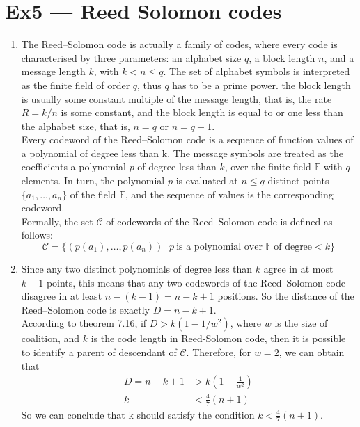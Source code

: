 \documentclass[12pt, a4paper]{article}
\begin{document}
\section*{Ex5 --- Reed Solomon codes}
\begin{enumerate}
    \item The Reed–Solomon code is actually a family of codes, where every code is characterised by three parameters: 
          an alphabet size $q$, a block length $n$, and a message length $k$, with $k < n \leq q$. 
          The set of alphabet symbols is interpreted as the finite field of order $q$, thus $q$ has to be a prime power. 
          the block length is usually some constant multiple of the message length, that is, the rate $R = k/n$ is some constant, 
          and the block length is equal to or one less than the alphabet size, that is, $n = q$ or $n = q - 1$.\\
          Every codeword of the Reed–Solomon code is a sequence of function values of a polynomial of degree less than k. 
          The message symbols are treated as the coefficients a polynomial $p$ of degree less than $k$, 
          over the finite field $\mathbb{F}$ with $q$ elements. In turn, 
          the polynomial $p$ is evaluated at $n \leq q$ distinct points $\{a_1,\dots, a_n\}$ of the field $\mathbb{F}$, 
          and the sequence of values is the corresponding codeword.\\
          Formally, the set $\mathcal{C}$  of codewords of the Reed–Solomon code is defined as follows:
          $$\mathcal{C} = \{(p(a_1),\dots,p(a_n))\, | \, p\ \text{is a polynomial over }\mathbb{F}\ \text{of degree} < k\}$$
    \item Since any two distinct polynomials of degree less than $k$ agree in at most $k-1$ points, 
          this means that any two codewords of the Reed–Solomon code disagree in at least $n-(k-1)=n-k+1$ positions. 
          So the distance of the Reed–Solomon code is exactly $D=n-k+1$.\\
          According to theorem 7.16, if $D > k(1- 1/w^2)$, where $w$ is the size of coalition, 
          and $k$ is the code length in Reed-Solomon code, then it is possible to identify a parent of descendant of $\mathcal{C}$. 
          Therefore, for $w = 2$, we can obtain that
          \begin{align*}
              D = n - k + 1 &> k(1 - \frac{1}{w^2})\\
              k &< \frac{4}{7}(n+1)
          \end{align*}
          So we can conclude that k should satisfy the condition $k < \frac{4}{7}(n + 1)$. 
          
\end{enumerate}
\end{document}
